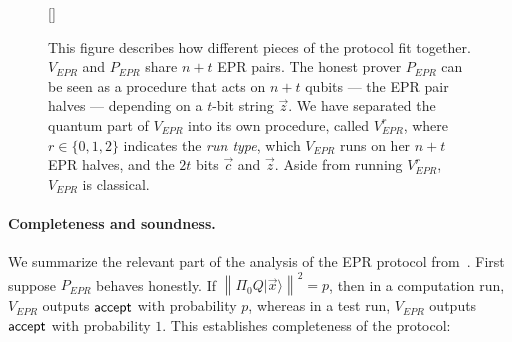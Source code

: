 \documentclass{toc}
\newcommand{\ket}[1]{|#1\rangle}
\newcommand{\norm}[1]{\left\|#1\right\|}
\begin{document}
\begin{figure}[t]
[\FBwidth]
{
  
}
{\caption{This figure describes how different pieces of the protocol fit together. $V_{EPR}$ and $P_{EPR}$ share $n+t$ EPR pairs. The honest prover $P_{EPR}$ can be seen as a procedure that acts on $n+t$ qubits --- the EPR pair halves --- depending on a $t$-bit string $\vec{z}$.  We have separated the quantum part of $V_{EPR}$ into its own procedure, called $V_{EPR}^{r}$, where $r\in\{0,1,2\}$ indicates the \emph{run type}, which $V_{EPR}$ runs on her $n+t$ EPR halves, and the $2t$ bits $\vec{c}$ and $\vec{z}$. Aside from running $V_{EPR}^r$, $V_{EPR}$ is classical. }\label{fig:EPR-high-level}}
\end{figure}






\paragraph{Completeness and soundness.}  %
We summarize the relevant part of the analysis of the EPR protocol from~\cite{broadbent15howtoverify}. First suppose $P_{EPR}$ behaves honestly. If $\norm{\Pi_0 Q\ket{\vec{x}}}^2=p$, then in a computation run, $V_{EPR}$ outputs $\sf accept$ with probability $p$, whereas in a test run, $V_{EPR}$ outputs $\sf accept$ with probability $1$. This establishes completeness of the protocol:
\end{document}
